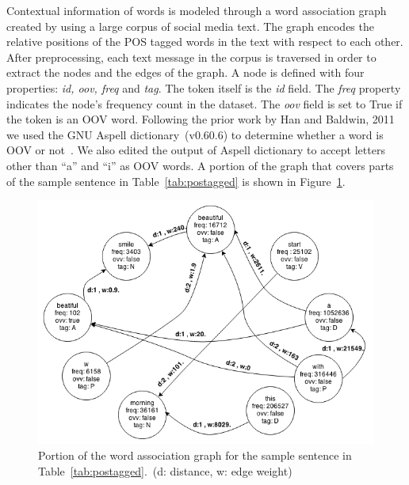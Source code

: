 \documentclass[a4paper,onesided,12pt]{report}
\begin{document}
Contextual information of words is modeled through a word association graph created by using a large corpus of social media text. The graph encodes the relative positions of the POS tagged words in the text with respect to each other. After preprocessing, each text message in the corpus is traversed in order to extract the nodes and the edges of the graph.
A node is defined with four properties: \textit{id, oov, freq} and \textit{tag}. The token itself is the \textit{id} field. The \textit{freq} property indicates the node's frequency count in the dataset. The \textit{oov} field is set to True if the token is an OOV word. Following the prior work by Han and Baldwin, 2011 we used the GNU Aspell dictionary~(v0.60.6) to determine whether a word is OOV or not~\cite{Han:2011:LNS:2002472.2002520}. We also edited the output of Aspell dictionary to accept letters other than ``a'' and ``i'' as OOV words. A portion of the graph that covers parts of the sample sentence in Table~\ref{tab:postagged} is shown in Figure~\ref{fig:graph}.

\begin{figure}[htb]
\begin{center}
\includegraphics[scale=0.6]{fig/graph}
\caption{Portion of the word association graph for the sample sentence in Table~\ref{tab:postagged}.~(d: distance, w: edge weight)}
\label{fig:graph}
\end{center}
\end{figure}
\end{document}
